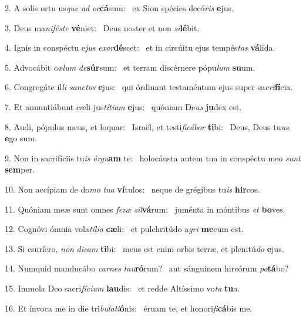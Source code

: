 2. A solis ortu us\textit{que} \textit{ad} \textit{oc}\textbf{cá}sum: \ast\  ex Sion spécies decó\textit{ris} \textbf{e}jus.\

3. Deus ma\textit{ni}\textit{fés}\textit{te} \textbf{vé}niet: \ast\  Deus noster et non \textit{si}\textbf{lé}bit.\

4. Ignis in conspéctu e\textit{jus} \textit{ex}\textit{ar}\textbf{dé}scet: \ast\  et in circúitu ejus tempés\textit{tas} \textbf{vá}lida.\

5. Advocábit \textit{cæ}\textit{lum} \textit{de}\textbf{súr}sum: \ast\  et terram discérnere pópu\textit{lum} \textbf{su}um.\

6. Congregáte il\textit{li} \textit{sanc}\textit{tos} \textbf{e}jus: \ast\  qui órdinant testaméntum ejus super sa\textit{cri}\textbf{fí}cia.\

7. Et annuntiábunt cæli jus\textit{tí}\textit{ti}\textit{am} \textbf{e}jus: \ast\  quóniam De\textit{us} \textbf{ju}dex est.\

8. Audi, pópulus meus, et loquar: \dag\  Israël, et testi\textit{fi}\textit{cá}\textit{bor} \textbf{ti}bi: \ast\  Deus, Deus tu\textit{us} \textbf{e}go sum.\

9. Non in sacrifíciis tu\textit{is} \textit{ár}\textit{gu}\textbf{am} te: \ast\  holocáusta autem tua in conspéctu meo \textit{sunt} \textbf{sem}per.\

10. Non accípiam de do\textit{mo} \textit{tu}\textit{a} \textbf{ví}tulos: \ast\  neque de grégibus tu\textit{is} \textbf{hir}cos.\

11. Quóniam meæ sunt omnes \textit{fe}\textit{ræ} \textit{sil}\textbf{vá}rum: \ast\  juménta in móntibus \textit{et} \textbf{bo}ves.\

12. Cognóvi ómnia vola\textit{tí}\textit{li}\textit{a} \textbf{cæ}li: \ast\  et pulchritúdo a\textit{gri} \textbf{me}cum est.\

13. Si esuríero, \textit{non} \textit{di}\textit{cam} \textbf{ti}bi: \ast\  meus est enim orbis terræ, et plenitú\textit{do} \textbf{e}jus.\

14. Numquid manducábo \textit{car}\textit{nes} \textit{tau}\textbf{ró}rum? \ast\  aut sánguinem hircórum \textit{po}\textbf{tá}bo?\

15. Immola Deo sacri\textit{fí}\textit{ci}\textit{um} \textbf{lau}dis: \ast\  et redde Altíssimo vo\textit{ta} \textbf{tu}a.\

16. Et ínvoca me in die tri\textit{bu}\textit{la}\textit{ti}\textbf{ó}nis: \ast\  éruam te, et honori\textit{fi}\textbf{cá}bis me.\

